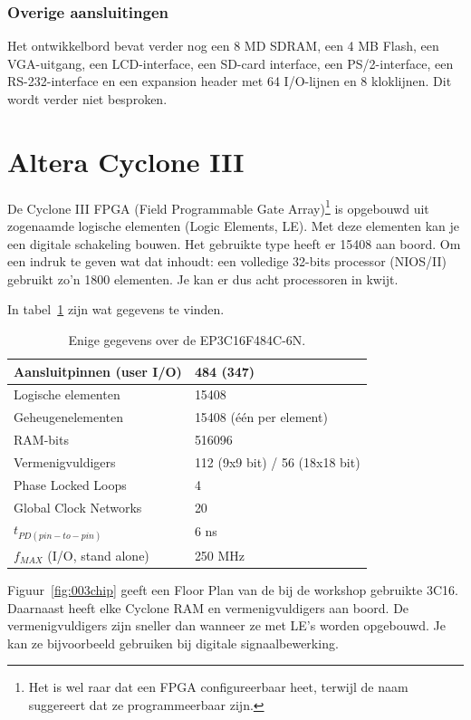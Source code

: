 \documentclass[a4paper,12pt,fleqn,twoside]{book}
\begin{document}
\subsubsection{Overige aansluitingen}
Het ontwikkelbord bevat verder nog een 8 MD SDRAM, een 4 MB Flash, een
VGA-uitgang, een LCD-interface, een SD-card interface, een PS/2-interface, een
RS-232-interface en een expansion header met 64 I/O-lijnen en 8 kloklijnen. Dit
wordt verder niet besproken.


\section{Altera Cyclone III}
\label{sec:alteracycloneiii}
De Cyclone III FPGA (Field Programmable Gate Array)\footnote{Het is wel raar
dat een FPGA configureerbaar heet, terwijl de naam suggereert dat ze
programmeerbaar zijn.} is opgebouwd uit zogenaamde logische elementen (Logic
Elements, LE). Met deze elementen kan je een digitale schakeling bouwen. Het 
gebruikte type heeft er 15408 aan boord. Om een indruk te geven wat dat
inhoudt: een volledige 32-bits processor (NIOS/II) gebruikt zo'n 1800
elementen. Je kan er dus acht processoren in kwijt.

In tabel~\ref{tab:gegevenscyclone} zijn wat gegevens te vinden.
\begin{table}[H]
\caption{Enige gegevens over de EP3C16F484C-6N.}
\label{tab:gegevenscyclone}
\centering
\begin{tabular}{|l|l|}
\hline 
Aansluitpinnen (user I/O) & 484 (347) \\ 
\hline 
Logische elementen & 15408 \\ 
\hline 
Geheugenelementen & 15408 (\'{e}\'{e}n per element) \\ 
\hline 
RAM-bits & 516096 \\ 
\hline 
Vermenigvuldigers & 112 (9x9 bit) / 56 (18x18 bit) \\ 
\hline 
Phase Locked Loops & 4 \\ 
\hline 
Global Clock Networks & 20 \\ 
\hline 
$t_{PD(pin-to-pin)}$ & 6 ns \\ 
\hline 
$f_{MAX}$ (I/O, stand alone) & 250 MHz \\ 
\hline 
\end{tabular} 
\end{table}

Figuur~\ref{fig:003chip} geeft een Floor Plan van de bij de workshop gebruikte
3C16. Daarnaast heeft elke Cyclone RAM en vermenigvuldigers aan boord. De
vermenigvuldigers zijn sneller dan wanneer ze met LE's worden opgebouwd.
Je kan ze bijvoorbeeld gebruiken bij digitale signaalbewerking.
\end{document}
